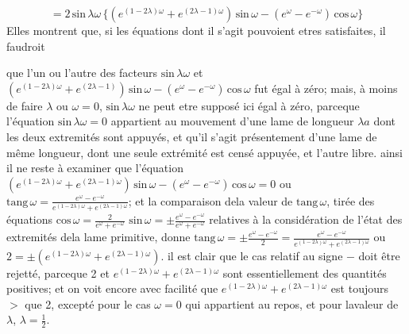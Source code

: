 \documentclass[11pt,a4paper]{article}
\begin{document}
\[ = 2\,\text{sin}\,\lambda\omega\,\{(e^{(1-2\lambda)\omega} + e^{(2\lambda-1)\omega})\,\text{sin}\,\omega - (e^{\omega} - e^{-\omega})\,\text{cos}\,\omega\} \]
Elles montrent que, si les équations dont il s'agit pouvoient etres satisfaites, il faudroit


que l'un ou l'autre des facteurs $\text{sin}\,\lambda\omega$ et $(e^{(1-2\lambda)\omega} + e^{(2\lambda-1)})\,\text{sin}\,\omega - (e^{\omega} - e^{-\omega})\,\text{cos}\,\omega$ fut égal
à zéro; mais, à moins de faire $\lambda$ ou $\omega = 0$, $\text{sin}\,\lambda\omega$ ne peut etre supposé ici égal à zéro,
parceque l'équation $\text{sin}\,\lambda\omega = 0$ appartient au mouvement d'une lame de longueur $\lambda a$
dont les deux extremités sont appuyés, et qu'il s'agit présentement d'une lame de
même longueur, dont une seule extrémité est censé appuyée, et l'autre libre.
ainsi il ne reste à examiner que l'équation $(e^{(1-2\lambda)\omega} + e^{(2\lambda-1)\omega})\,\text{sin}\,\omega - (e^{\omega} - e^{-\omega})\,\text{cos}\,\omega = 0$
ou $\text{tang}\,\omega = \frac{e^{\omega} - e^{-\omega}}{e^{(1-2\lambda)\omega} + e^{(2\lambda-1)\omega}}$; et la comparaison dela valeur de $\text{tang}\,\omega$, tirée
des équations $\text{cos}\,\omega = \frac{2}{e^{\omega} + e^{-\omega}}$ $\text{sin}\,\omega = \pm\frac{e^{\omega} - e^{-\omega}}{e^{\omega} + e^{-\omega}}$ relatives à la considération de l'état
des extremités dela lame primitive, donne $\text{tang}\,\omega = \pm\frac{e^{\omega} - e^{-\omega}}{2} = \frac{e^{\omega} - e^{-\omega}}{e^{(1-2\lambda)\omega} + e^{(2\lambda-1)\omega}}$
ou $2 = \pm(e^{(1-2\lambda)\omega} + e^{(2\lambda-1)\omega})$. il est clair que le cas relatif au signe $-$ doit être
rejetté, parceque 2 et $e^{(1-2\lambda)\omega} + e^{(2\lambda-1)\omega}$ sont essentiellement des quantités positives; et
on voit encore avec facilité que $e^{(1-2\lambda)\omega} + e^{(2\lambda-1)\omega}$ est toujours $>$ que 2,
excepté pour le cas $\omega = 0$ qui appartient au repos, et pour lavaleur de $\lambda$, $\lambda = \frac{1}{2}$.
\end{document}
